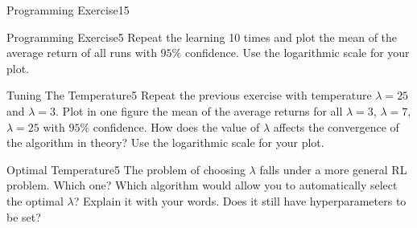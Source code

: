 \begin{questions}
\begin{question}{Programming Exercise}{15}
\end{question}




\begin{question}{Programming Exercise}{5}
Repeat the learning 10 times and plot the mean of the average return of all runs with $95\%$ confidence.
Use the logarithmic scale for your plot.
    
\begin{answer}\end{answer}

\end{question}




\begin{question}{Tuning The Temperature}{5}
Repeat the previous exercise with temperature $\lambda = 25$ and $\lambda = 3$. Plot in one figure the mean of the average returns for all $\lambda = 3$, $\lambda = 7$, $\lambda = 25$ with $95\%$ confidence.
How does the value of $\lambda$ affects the convergence of the algorithm in theory? 
Use the logarithmic scale for your plot.

\begin{answer}\end{answer}


\end{question}


\begin{question}[bonus]{Optimal Temperature}{5}
The problem of choosing $\lambda$ falls under a more general RL problem. Which one?
Which algorithm would allow you to automatically select the optimal $\lambda$? Explain it with your words.
Does it still have hyperparameters to be set?

\begin{answer}\end{answer}


\end{question}


\end{questions}

